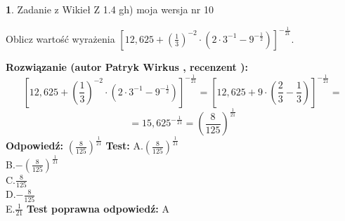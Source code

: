 \documentclass[12pt, a4paper]{article}
\theoremstyle{definition} %
\newtheorem{zad}{}
\newcommand{\zadStart}[1]{\begin{zad}#1\newline}
\newcommand{\zadStop}{\end{zad}}
\newcommand{\rozwStart}[2]{\noindent \textbf{Rozwiązanie (autor #1 , recenzent #2): }\newline}
\newcommand{\rozwStop}{\newline}
\newcommand{\odpStart}{\noindent \textbf{Odpowiedź:}\newline}
\newcommand{\odpStop}{\newline}
\newcommand{\testStart}{\noindent \textbf{Test:}\newline}
\newcommand{\testStop}{\newline}
\newcommand{\kluczStart}{\noindent \textbf{Test poprawna odpowiedź:}\newline}
\newcommand{\kluczStop}{\newline}
\begin{document}
\zadStart{Zadanie z Wikieł Z 1.4 gh) moja wersja nr 10}

Oblicz wartość wyrażenia $[12,625+(\frac{1}{3})^{-2}\cdot(2\cdot 3^{-1} - 9^{-\frac{1}{2}})]^{-\frac{1}{21}}$.
\zadStop
\rozwStart{Patryk Wirkus}{}
$$[12,625+(\frac{1}{3})^{-2}\cdot(2\cdot 3^{-1} - 9^{-\frac{1}{2}})]^{-\frac{1}{21}} = [12,625+9\cdot (\frac{2}{3}-\frac{1}{3})]^{-\frac{1}{21}} =$$
$$=15,625^{-\frac{1}{21}} = (\frac{8}{125})^\frac{1}{21}$$
\rozwStop
\odpStart
$(\frac{8}{125})^\frac{1}{21}$
\odpStop
\testStart
A.$(\frac{8}{125})^\frac{1}{21}$\\ B.$-(\frac{8}{125})^\frac{1}{21}$\\ C.$\frac{8}{125}$\\ D.$-\frac{8}{125}$\\ E.$\frac{1}{21}$
\testStop
\kluczStart
A
\kluczStop
\end{document}
